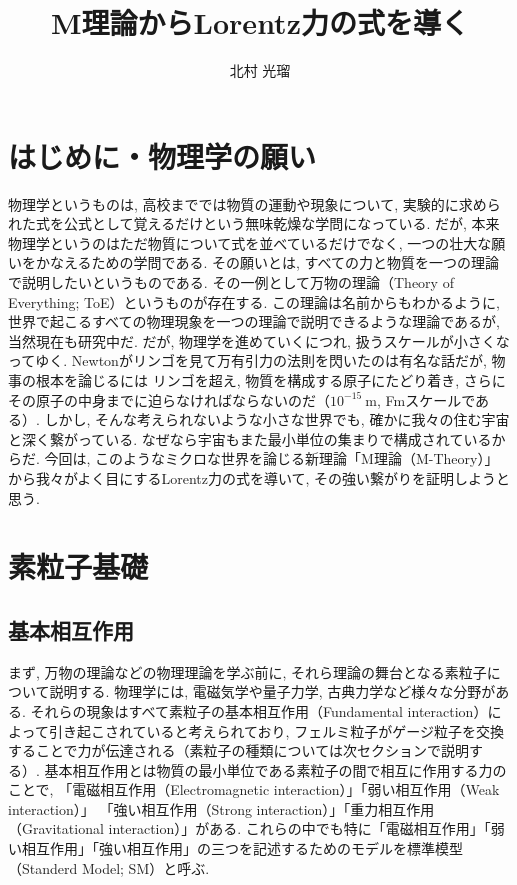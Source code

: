 \documentclass{ltjsarticle}
\begin{document}
\title{M理論からLorentz力の式を導く}
\author{北村 光瑠}
\maketitle


\section{はじめに・物理学の願い}
物理学というものは, 高校まででは物質の運動や現象について, 実験的に求められた式を公式として覚えるだけという無味乾燥な学問になっている. 
だが, 本来物理学というのはただ物質について式を並べているだけでなく, 一つの壮大な願いをかなえるための学問である. 
その願いとは, すべての力と物質を一つの理論で説明したいというものである. 
その一例として万物の理論（Theory of Everything; ToE）というものが存在する. 
この理論は名前からもわかるように, 世界で起こるすべての物理現象を一つの理論で説明できるような理論であるが, 当然現在も研究中だ. 
だが, 物理学を進めていくにつれ, 扱うスケールが小さくなってゆく. 
Newtonがリンゴを見て万有引力の法則を閃いたのは有名な話だが, 物事の根本を論じるには
リンゴを超え, 物質を構成する原子にたどり着き, さらにその原子の中身までに迫らなければならないのだ（$10^{-15}~\mathrm{m}$, Fmスケールである）. 
しかし, そんな考えられないような小さな世界でも, 確かに我々の住む宇宙と深く繋がっている. なぜなら宇宙もまた最小単位の集まりで構成されているからだ. 
今回は, このようなミクロな世界を論じる新理論「M理論（M-Theory）」から我々がよく目にするLorentz力の式を導いて, その強い繋がりを証明しようと思う. 


\section{素粒子基礎}
\subsection{基本相互作用}
まず, 万物の理論などの物理理論を学ぶ前に, それら理論の舞台となる素粒子について説明する. 
物理学には, 電磁気学や量子力学, 古典力学など様々な分野がある. 
それらの現象はすべて素粒子の基本相互作用（Fundamental interaction）によって引き起こされていると考えられており, フェルミ粒子がゲージ粒子を交換することで力が伝達される（素粒子の種類については次セクションで説明する）. 
基本相互作用とは物質の最小単位である素粒子の間で相互に作用する力のことで, 「電磁相互作用（Electromagnetic interaction）」「弱い相互作用（Weak interaction）」
「強い相互作用（Strong interaction）」「重力相互作用（Gravitational interaction）」がある. 
これらの中でも特に「電磁相互作用」「弱い相互作用」「強い相互作用」の三つを記述するためのモデルを標準模型（Standerd Model; SM）と呼ぶ. 
\end{document}
